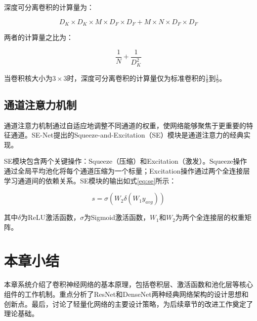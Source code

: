 深度可分离卷积的计算量为：

\begin{equation}
    D_K \times D_K \times M \times D_F \times D_F + M \times N \times D_F \times D_F
\end{equation}

两者的计算量之比为：

\begin{equation}
    \frac{1}{N} + \frac{1}{D_K^2}
    \label{eq:dsc_ratio}
\end{equation}

当卷积核大小为$3 \times 3$时，深度可分离卷积的计算量仅为标准卷积的$\frac{1}{8}$到$\frac{1}{9}$。

\subsection{通道注意力机制}

通道注意力机制通过自适应地调整不同通道的权重，使网络能够聚焦于更重要的特征通道。SE-Net提出的Squeeze-and-Excitation（SE）模块是通道注意力的经典实现。

SE模块包含两个关键操作：Squeeze（压缩）和Excitation（激发）。Squeeze操作通过全局平均池化将每个通道压缩为一个标量；Excitation操作通过两个全连接层学习通道间的依赖关系。SE模块的输出如式\eqref{eq:se}所示：

\begin{equation}
    s = \sigma(W_2 \delta(W_1 y_{avg}))
    \label{eq:se}
\end{equation}

其中$\delta$为ReLU激活函数，$\sigma$为Sigmoid激活函数，$W_1$和$W_2$为两个全连接层的权重矩阵。

\section{本章小结}

本章系统介绍了卷积神经网络的基本原理，包括卷积层、激活函数和池化层等核心组件的工作机制。重点分析了ResNet和DenseNet两种经典网络架构的设计思想和创新点。最后，讨论了轻量化网络的主要设计策略，为后续章节的改进工作奠定了理论基础。
